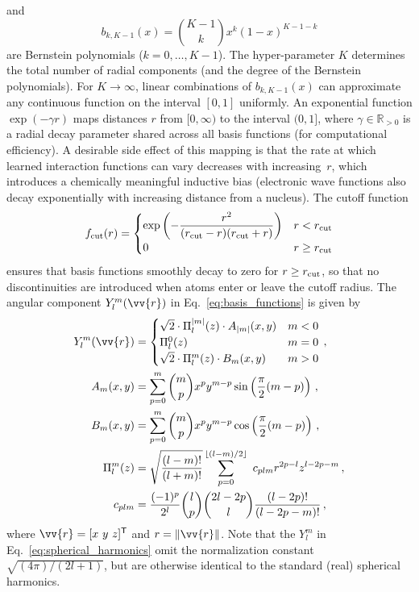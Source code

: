 \documentclass[%
superscriptaddress,
reprint,
nofootinbib,
amsmath,amssymb,amsfonts,
floatfix,
altaffilletter,
showkeys,
]{revtex4-2}
\begin{document}
and
\begin{equation}
b_{k,K-1}(x) =\binom{K-1}{k}x^{k}(1-x)^{K-1-k}
\label{eq:bernstein_polynomials}
\end{equation}
are Bernstein polynomials ($k=0,\dots, K-1$). The hyper-parameter $K$ determines the total number of radial components (and the degree of the Bernstein polynomials). For $K\to\infty$, linear combinations of $b_{k,K-1}(x)$ can approximate any continuous function on the interval $[0,1]$ uniformly.\cite{bernstein1912demo} An exponential function $\exp({-\gamma r})$ maps distances $r$ from $[0,\infty)$ to the interval $(0,1]$, where $\gamma\in\mathbb{R}_{>0}$ is a radial decay parameter shared across all basis functions (for computational efficiency). A desirable side effect of this mapping is that the rate at which learned interaction functions can vary decreases with increasing~$r$, which introduces a chemically meaningful inductive bias (electronic wave functions also decay exponentially with increasing distance from a nucleus).\cite{unke2019physnet,hermann2020deep} The cutoff function
\begin{equation}
f_{\rm cut}(r) = \begin{cases}
\exp\left(-\dfrac{r^2}{(r_{\rm cut}-r)(r_{\rm cut}+r)}\right) & r < r_{\rm cut}\\
0 & r \geq r_{\rm cut}
\end{cases}
\label{eq:cutoff_function}
\end{equation}
ensures that basis functions smoothly decay to zero for $r\geq r_{\rm cut}$, so that no discontinuities are introduced when atoms enter or leave the cutoff radius. The angular component $Y_{l}^{m}(\vv{r})$ in Eq.~\ref{eq:basis_functions} is given by
\begin{equation}
\begin{aligned}
Y_{l}^{m}(\vv{r}) &= \begin{cases}
\sqrt{2}\cdot \Pi_l^{\lvert m\rvert}(z) \cdot A_{\lvert m \rvert}(x,y)
& m < 0 \\
\Pi_l^{0}(z)
& m = 0 \\
\sqrt{2}\cdot \Pi_l^{m}(z) \cdot B_m(x,y)
& m > 0 \\
\end{cases}\,,\\
A_{m}(x,y) &= \sum_{p=0}^{ m}\binom{m}{p}x^{p} y^{m-p} \sin\left(\frac{\pi}{2}( m-p)\right)\,,\\
B_{m}(x,y) &= \sum_{p=0}^{m}\binom{m}{p}x^{p} y^{m-p} \cos\left(\frac{\pi}{2}(m-p)\right)\,,\\
\Pi_{l}^{m}(z) &= \sqrt{\frac{(l-m)!}{(l+m)!}} \sum_{p=0}^{\lfloor(l-m)/2\rfloor} \ c_{plm} r^{2p-l}z^{l-2p-m}\,,\\
c_{plm} &= \frac{(-1)^p}{2^l}\binom{l}{p}\binom{2l-2p}{l}\frac{(l-2p)!}{(l-2p-m)!}\,,
\end{aligned}
\label{eq:spherical_harmonics}
\end{equation}
where $\vv{r} = [x\ y \ z]^{\mathsf{T}}$ and $r=\lVert\vv{r}\rVert$. Note that the $Y_{l}^{m}$ in Eq.~\ref{eq:spherical_harmonics} omit the normalization constant $\sqrt{(4\pi)/(2l+1)}$, but are otherwise identical to the standard (real) spherical harmonics.
\end{document}
